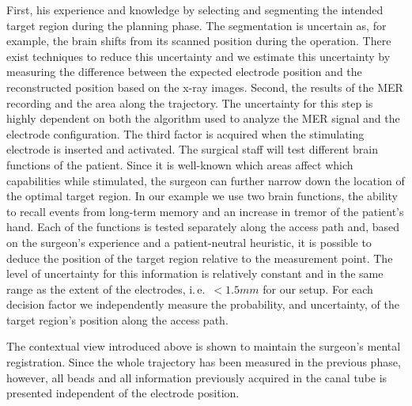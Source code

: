 \documentclass[review]{vgtc}                 %
\begin{document}
First, his experience and knowledge by selecting and segmenting the intended target region during the planning phase. The segmentation is uncertain as, for example, the brain shifts from its scanned position during the operation. There exist techniques to reduce this uncertainty and we estimate this uncertainty by measuring the difference between the expected electrode position and the reconstructed position based on the x-ray images. Second, the results of the MER recording and the area along the trajectory. The uncertainty for this step is highly dependent on both the algorithm used to analyze the MER signal and the electrode configuration. The third factor is acquired when the stimulating electrode is inserted and activated. The surgical staff will test different brain functions of the patient. Since it is well-known which areas affect which capabilities while stimulated, the surgeon can further narrow down the location of the optimal target region. In our example we use two brain functions, the ability to recall events from long-term memory and an increase in tremor of the patient's hand. Each of the functions is tested separately along the access path and, based on the surgeon's experience and a patient-neutral heuristic, it is possible to deduce the position of the target region relative to the measurement point. The level of uncertainty for this information is relatively constant and in the same range as the extent of the electrodes, i.\,e.~$< 1.5 mm$ for our setup. For each decision factor we independently measure the probability, and uncertainty, of the target region's position along the access path.

The contextual view introduced above is shown to maintain the surgeon's mental registration. Since the whole trajectory has been measured in the previous phase, however, all beads and all information previously acquired in the canal tube is presented independent of the electrode position. 
\end{document}
